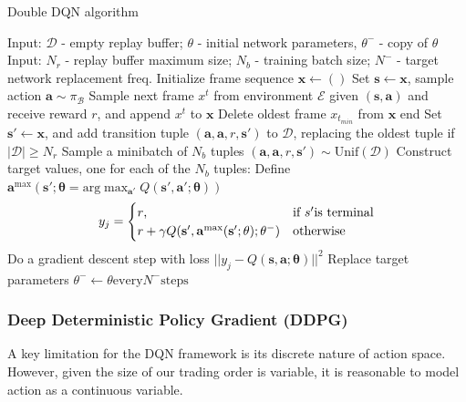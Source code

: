 \documentclass{article}
\begin{document}
\begin{algorithm}[h]
	\caption{Double DQN algorithm}
	\label{alg:dqn}
	\begin{algorithmic}
		\STATE Input: $\mathcal{D}$ - empty replay buffer; $\theta$ - initial network parameters, $\theta^-$ - copy of $\theta$
		\STATE Input: $N_r$ - replay buffer maximum size; $N_b$ - training batch size; $N^-$ - target network replacement freq.
			\STATE Initialize frame sequence $\mathbf{x}\leftarrow()$
				\STATE Set $\mathbf{s} \leftarrow \mathbf{x}$, sample action $\mathbf{a}\sim\pi_{\mathcal{B}}$
				\STATE Sample next frame $x^t$ from environment $\mathcal{E}$ given $(\mathbf{s}, \mathbf{a})$ and receive reward $r$, and append $x^t$ to $\mathbf{x}$
					\STATE Delete oldest frame $x_{t_{min}}$ from $\mathbf{x}$ end
				\ENDIF
				\STATE Set $\mathbf{s'} \leftarrow \mathbf{x}$, and add transition tuple $( \mathbf{a},\mathbf{a}, r, \mathbf{s'})$ to $\mathcal{D}$, replacing the oldest tuple if $|\mathcal{D}| \geq N_r$
				\STATE Sample a minibatch of $N_b$ tuples $( \mathbf{a},\mathbf{a}, r, \mathbf{s'}) \sim \mathrm{Unif} (\mathcal{D})$
				\STATE Construct target values, one for each of the $N_b$ tuples:
				\STATE Define $\mathbf{a}^{\max}( \mathbf{s'; \mathbf{\theta}} = \mathrm{arg} \max_{\mathbf{a'}} Q(\mathbf{s'}, \mathbf{a'}; \mathbf{\theta}) )$
				\[
					y_j = \begin{cases}
					\mbox{$r$,} & \mbox{if } s' $is terminal$ \\
					\mbox{$r + \gamma Q( \mathbf{s'}, \mathbf{a}^{\max} ( \mathbf{s'} ; \mathbf{\theta} ); \mathbf{\theta^-} )$} & \mbox{otherwise}
					\end{cases}
				\]
				\STATE Do a gradient descent step with loss ${ || y_j - Q ( \mathbf{s}, \mathbf{a}; \mathbf{\theta} ) || }^2$
				\STATE Replace target parameters $\theta^- \leftarrow \theta \mathrm{every} N^- \mathrm{steps}$
			\ENDFOR
		\ENDFOR
	\end{algorithmic}
\end{algorithm}

\subsubsection{Deep Deterministic Policy Gradient (DDPG)}

A key limitation for the DQN framework is its discrete nature of action space. However, given the size of our trading order is variable, it is reasonable to model action as a continuous variable. 
\end{document}
